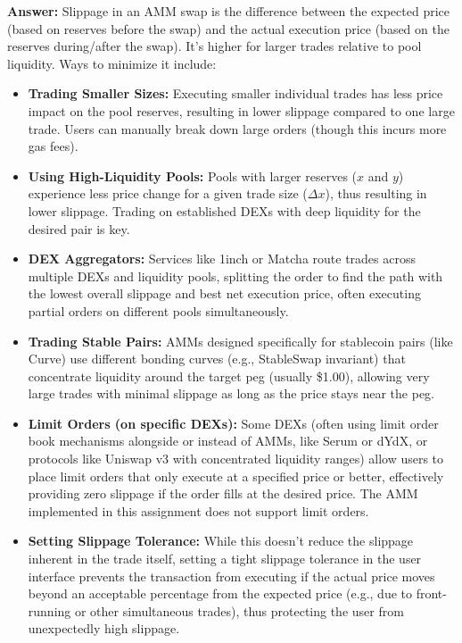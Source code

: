 \documentclass[12pt]{article}
\begin{document}
\textbf{Answer:} Slippage in an AMM swap is the difference between the expected price (based on reserves before the swap) and the actual execution price (based on the reserves during/after the swap). It's higher for larger trades relative to pool liquidity. Ways to minimize it include:
\begin{itemize}
    \item \textbf{Trading Smaller Sizes:} Executing smaller individual trades has less price impact on the pool reserves, resulting in lower slippage compared to one large trade. Users can manually break down large orders (though this incurs more gas fees).
    \item \textbf{Using High-Liquidity Pools:} Pools with larger reserves ($x$ and $y$) experience less price change for a given trade size ($\Delta x$), thus resulting in lower slippage. Trading on established DEXs with deep liquidity for the desired pair is key.
    \item \textbf{DEX Aggregators:} Services like 1inch or Matcha route trades across multiple DEXs and liquidity pools, splitting the order to find the path with the lowest overall slippage and best net execution price, often executing partial orders on different pools simultaneously.
    \item \textbf{Trading Stable Pairs:} AMMs designed specifically for stablecoin pairs (like Curve) use different bonding curves (e.g., StableSwap invariant) that concentrate liquidity around the target peg (usually \$1.00), allowing very large trades with minimal slippage as long as the price stays near the peg.
    \item \textbf{Limit Orders (on specific DEXs):} Some DEXs (often using limit order book mechanisms alongside or instead of AMMs, like Serum or dYdX, or protocols like Uniswap v3 with concentrated liquidity ranges) allow users to place limit orders that only execute at a specified price or better, effectively providing zero slippage if the order fills at the desired price. The AMM implemented in this assignment does not support limit orders.
    \item \textbf{Setting Slippage Tolerance:} While this doesn't reduce the slippage inherent in the trade itself, setting a tight slippage tolerance in the user interface prevents the transaction from executing if the actual price moves beyond an acceptable percentage from the expected price (e.g., due to front-running or other simultaneous trades), thus protecting the user from unexpectedly high slippage.
\end{itemize}
\end{document}

